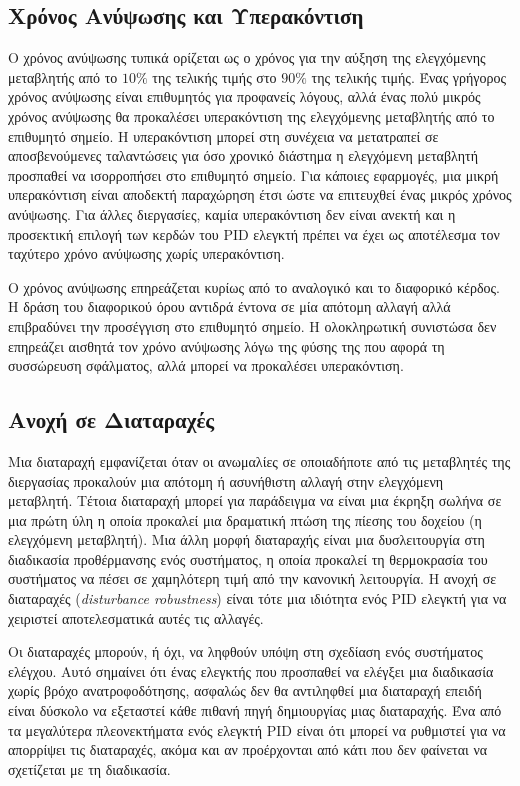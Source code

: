 \subsection{Χρόνος Ανύψωσης και Υπερακόντιση} \label{subsce:rise_time}

Ο χρόνος ανύψωσης τυπικά ορίζεται ως ο χρόνος για την αύξηση της ελεγχόμενης μεταβλητής από το $10\%$ της τελικής τιμής στο $90\%$ της τελικής τιμής. Ένας γρήγορος χρόνος ανύψωσης είναι επιθυμητός για προφανείς λόγους, αλλά ένας πολύ μικρός χρόνος ανύψωσης θα προκαλέσει υπερακόντιση της ελεγχόμενης μεταβλητής από το επιθυμητό σημείο. Η υπερακόντιση μπορεί στη συνέχεια να μετατραπεί σε αποσβενούμενες ταλαντώσεις για όσο χρονικό διάστημα η ελεγχόμενη μεταβλητή προσπαθεί να ισορροπήσει στο επιθυμητό σημείο. Για κάποιες εφαρμογές, μια μικρή υπερακόντιση είναι αποδεκτή παραχώρηση έτσι ώστε να επιτευχθεί ένας μικρός χρόνος ανύψωσης. Για άλλες διεργασίες, καμία υπερακόντιση δεν είναι ανεκτή και η προσεκτική επιλογή των κερδών του PID ελεγκτή πρέπει να έχει ως αποτέλεσμα τον ταχύτερο χρόνο ανύψωσης χωρίς υπερακόντιση. 

Ο χρόνος ανύψωσης επηρεάζεται κυρίως από το αναλογικό και το διαφορικό κέρδος. Η δράση του διαφορικού όρου αντιδρά έντονα σε μία απότομη αλλαγή αλλά επιβραδύνει την προσέγγιση στο επιθυμητό σημείο. Η ολοκληρωτική συνιστώσα δεν επηρεάζει αισθητά τον χρόνο ανύψωσης λόγω της φύσης της που αφορά τη συσσώρευση σφάλματος, αλλά μπορεί να προκαλέσει υπερακόντιση. 

\subsection{Ανοχή σε Διαταραχές}

Μια διαταραχή εμφανίζεται όταν οι ανωμαλίες σε οποιαδήποτε από τις μεταβλητές της διεργασίας προκαλούν μια απότομη ή ασυνήθιστη αλλαγή στην ελεγχόμενη μεταβλητή. Τέτοια διαταραχή μπορεί για παράδειγμα να είναι μια έκρηξη σωλήνα σε μια πρώτη ύλη η οποία προκαλεί μια δραματική πτώση της πίεσης του δοχείου (η ελεγχόμενη μεταβλητή). Μια άλλη μορφή διαταραχής είναι μια δυσλειτουργία στη διαδικασία προθέρμανσης ενός συστήματος, η οποία προκαλεί τη θερμοκρασία του συστήματος να πέσει σε χαμηλότερη τιμή από την κανονική λειτουργία. Η ανοχή σε διαταραχές (\emph{disturbance robustness}) είναι τότε μια ιδιότητα ενός PID ελεγκτή για να χειριστεί αποτελεσματικά αυτές τις αλλαγές.

Οι διαταραχές μπορούν, ή όχι, να ληφθούν υπόψη στη σχεδίαση ενός συστήματος ελέγχου. Αυτό σημαίνει ότι ένας ελεγκτής που προσπαθεί να ελέγξει μια διαδικασία χωρίς βρόχο ανατροφοδότησης, ασφαλώς δεν θα αντιληφθεί μια διαταραχή επειδή είναι δύσκολο να εξεταστεί κάθε πιθανή πηγή δημιουργίας μιας διαταραχής. Ένα από τα μεγαλύτερα πλεονεκτήματα ενός ελεγκτή PID είναι ότι μπορεί να ρυθμιστεί για να απορρίψει τις διαταραχές, ακόμα και αν προέρχονται από κάτι που δεν φαίνεται να σχετίζεται με τη διαδικασία.

